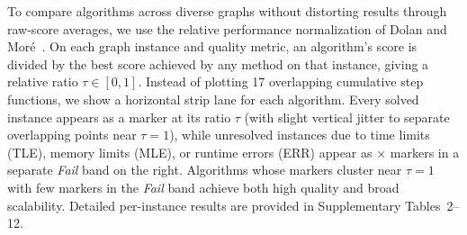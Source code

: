 \documentclass[11pt,a4paper]{article}
\begin{document}
To compare algorithms across diverse graphs without distorting results through raw-score averages, we use the relative performance normalization of Dolan and Mor{\'e}~\cite{perf2002}. On each graph instance and quality metric, an algorithm's score is divided by the best score achieved by any method on that instance, giving a relative ratio $\tau \in [0, 1]$. Instead of plotting 17 overlapping cumulative step functions, we show a horizontal strip lane for each algorithm. Every solved instance appears as a marker at its ratio $\tau$ (with slight vertical jitter to separate overlapping points near $\tau = 1$), while unresolved instances due to time limits (TLE), memory limits (MLE), or runtime errors (ERR) appear as $\times$ markers in a separate \emph{Fail} band on the right. Algorithms whose markers cluster near $\tau = 1$ with few markers in the \emph{Fail} band achieve both high quality and broad scalability. Detailed per-instance results are provided in Supplementary Tables~2--12.
\end{document}
